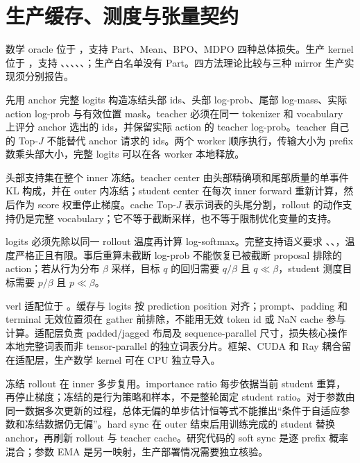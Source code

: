 \section{生产缓存、测度与张量契约}
\label{opd:production-contract}

数学 oracle 位于 ，支持 Part、Mean、BPO、MDPO 四种总体损失。生产 kernel 位于 ，支持 、、、、、；生产白名单没有 Part。四方法理论比较与三种 mirror 生产实现须分别报告。

 先用 anchor 完整 logits 构造冻结头部 ids、头部 log-prob、尾部 log-mass、实际 action log-prob 与有效位置 mask。teacher 必须在同一 tokenizer 和 vocabulary 上评分 anchor 选出的 ids，并保留实际 action 的 teacher log-prob。teacher 自己的 Top-$J$ 不能替代 anchor 请求的 ids。两个 worker 顺序执行，传输大小为 prefix 数乘头部大小，完整 logits 可以在各 worker 本地释放。

头部支持集在整个 inner 冻结。teacher center 由头部精确项和尾部质量的单事件 KL 构成，并在 outer 内冻结；student center 在每次 inner forward 重新计算，然后作为 score 权重停止梯度。cache Top-$J$ 表示词表的头尾分割，rollout 的动作支持仍是完整 vocabulary；它不等于截断采样，也不等于限制优化变量的支持。

logits 必须先除以同一 rollout 温度再计算 log-softmax。完整支持语义要求 、、，温度严格正且有限。事后重算未截断 log-prob 不能恢复已被截断 proposal 排除的 action；若从行为分布 $\beta$ 采样，目标 $q$ 的回归需要 $q/\beta$ 且 $q\ll\beta$，student 测度目标需要 $p/\beta$ 且 $p\ll\beta$。

verl 适配位于 。缓存与 logits 按 prediction position 对齐；prompt、padding 和 terminal 无效位置须在 gather 前排除，不能用无效 token id 或 NaN cache 参与计算。适配层负责 padded/jagged 布局及 sequence-parallel 尺寸，损失核心操作本地完整词表而非 tensor-parallel 的独立词表分片。框架、CUDA 和 Ray 耦合留在适配层，生产数学 kernel 可在 CPU 独立导入。

冻结 rollout 在 inner 多步复用。importance ratio 每步依据当前 student 重算，再停止梯度；冻结的是行为策略和样本，不是整轮固定 student ratio。对于参数由同一数据多次更新的过程，总体无偏的单步估计恒等式不能推出“条件于自适应参数和冻结数据仍无偏”。hard sync 在 outer 结束后用训练完成的 student 替换 anchor，再刷新 rollout 与 teacher cache。研究代码的 soft sync 是逐 prefix 概率混合；参数 EMA 是另一映射，生产部署情况需要独立核验。

